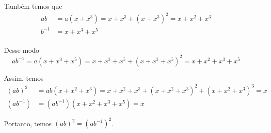     	\par\vspace{0.3cm} Também temos que
    	\begin{align*}
        	ab &= a(x+x^3) = x+x^3+(x+x^3)^2 = x+x^2+x^3 \\
        	b^{-1} &= x+x^3+x^5 \\
    	\end{align*}
    	\par\vspace{0.3cm} Desse modo
    	\begin{equation*}
        	ab^{-1} = a(x+x^3+x^5) = x+x^3+x^5+(x+x^3+x^5)^2 = x+x^2+x^3+x^5
    	\end{equation*}
    	\par\vspace{0.3cm} Assim, temos
    	\begin{align*}
        	(ab)^2 &= ab(x+x^2+x^3) = x+x^2+x^3 + (x+x^2+x^3)^2 + (x+x^2+x^3)^3 = x \\
        	(ab^{-1}) &= (ab^{-1})(x+x^2+x^3+x^5) = x
    	\end{align*}
    	\par\vspace{0.3cm} Portanto, temos $(ab)^2=(ab^{-1})^2$.